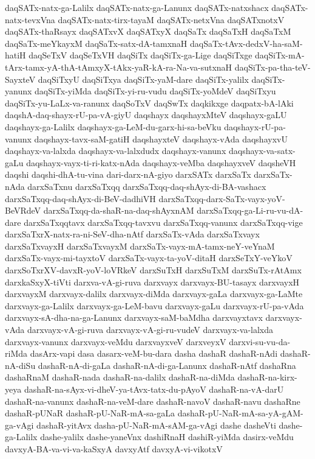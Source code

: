 {daqSATx-natx-ga-Lalilx
daqSATx-natx-ga-Lanunx
daqSATx-natxshacx
daqSATx-natx-tevxVna
daqSATx-natx-tirx-tayaM
daqSATx-netxVna
daqSATxnotxV
daqSATx-thaRsayx
daqSATxvX
daqSATxyX
daqSaTx
daqSaTxH
daqSaTxM
daqSaTx-meYkayxM
daqSaTx-satx-dA-tamxnaH
daqSaTx-tAvx-dedxV-ha-saM-hatiH
daqSeTxV
daqSeTxVH
daqSiTx
daqSiTx-ga-Lige
daqSiTxge
daqSiTx-mA-tArx-tamx-yA-thA-tAmxyX-tAkx-yaR-kA-ra-Na-va-sutxnaH
daqSiTx-pa-tha-teV-SayxteV
daqSiTxyU
daqSiTxya
daqSiTx-yaM-dare
daqSiTx-yalilx
daqSiTx-yanunx
daqSiTx-yiMda
daqSiTx-yi-ru-vudu
daqSiTx-yoMdeV
daqSiTxyu
daqSiTx-yu-LaLx-va-ranunx
daqSoTxV
daqSwTx
daqkikxge
daqpatx-bA-lAki
daqshA-daq-shayx-rU-pa-vA-giyU
daqshayx
daqshayxMteV
daqshayx-gaLU
daqshayx-ga-Lalilx
daqshayx-ga-LeM-du-garx-hi-sa-beVku
daqshayx-rU-pa-vanunx
daqshayx-tavx-saM-gatiH
daqshayxteV
daqshayx-vAda
daqshayxvU
daqshayx-va-lalxda
daqshayx-va-lalxdudx
daqshayx-vanunx
daqshayx-va-satx-gaLu
daqshayx-vayx-ti-ri-katx-nAda
daqshayx-veMba
daqshayxveV
daqsheVH
daqshi
daqshi-dhA-tu-vina
dari-darx-nA-giyo
darxSATx
darxSaTx
darxSaTx-nAda
darxSaTxnu
darxSaTxqq
darxSaTxqq-daq-shAyx-di-BA-vashacx
darxSaTxqq-daq-shAyx-di-BeV-dadhiVH
darxSaTxqq-darx-SaTx-vayx-yoV-BeVRdeV
darxSaTxqq-da-shaR-na-daq-shAyxnAM
darxSaTxqq-ga-Li-ru-vu-dA-dare
darxSaTxqqtavx
darxSaTxqq-tavxvu
darxSaTxqq-vanunx
darxSaTxqq-vige
darxSaTxrX-natx-ra-ni-SeV-dha-nAtf
darxSaTx-vAda
darxSaTxvayx
darxSaTxvayxH
darxSaTxvayxM
darxSaTx-vayx-mA-tamx-neY-veYnaM
darxSaTx-vayx-mi-tayxtoV
darxSaTx-vayx-ta-yoV-ditaH
darxSeTxY-veYkoV
darxSoTxrXV-davxR-yoV-loVRkeV
darxSuTxH
darxSuTxM
darxSuTx-rAtAmx
darxkaSxyX-tiVti
darxva-vA-gi-ruva
darxvayx
darxvayx-BU-tasayx
darxvayxH
darxvayxM
darxvayx-dalilx
darxvayx-diMda
darxvayx-gaLa
darxvayx-ga-LaMte
darxvayx-ga-Lalilx
darxvayx-ga-LeM-bavu
darxvayx-gaLu
darxvayx-rU-pa-vAda
darxvayx-sA-dha-na-ga-Lanunx
darxvayx-saM-baMdha
darxvayxtavx
darxvayx-vAda
darxvayx-vA-gi-ruva
darxvayx-vA-gi-ru-vudeV
darxvayx-va-lalxda
darxvayx-vanunx
darxvayx-veMdu
darxvayxveV
darxveyxV
darxvi-su-vu-da-riMda
dasArx-vapi
dasa
dasarx-veM-bu-dara
dasha
dashaR
dashaR-nAdi
dashaR-nA-diSu
dashaR-nA-di-gaLa
dashaR-nA-di-ga-Lanunx
dashaR-nAtf
dashaRna
dashaRnaM
dashaR-nada
dashaR-na-dalilx
dashaR-na-diMda
dashaR-na-kirx-yeya
dashaR-na-sAyx-vi-dheV-ya-tAvx-tatx-du-pAyoV
dashaR-na-vA-darU
dashaR-na-vanunx
dashaR-na-veM-dare
dashaR-navoV
dashaR-navu
dashaRne
dashaR-pUNaR
dashaR-pU-NaR-mA-sa-gaLa
dashaR-pU-NaR-mA-sa-yA-gAM-ga-vAgi
dashaR-yitAvx
dasha-pU-NaR-mA-sAM-ga-vAgi
dashe
dasheVti
dashe-ga-Lalilx
dashe-yalilx
dashe-yaneVnx
dashiRnaH
dashiR-yiMda
dasirx-veMdu
davxyA-BA-va-vi-va-kaSxyA
davxyAtf
davxyA-vi-vikotxV
}
